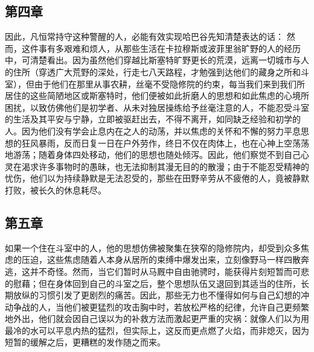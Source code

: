 
\subsection{第四章}

\par

因此，凡恒常持守这种警醒的人，必能有效实现哈巴谷先知清楚表达的话： 然而，这件事有多艰难和烦人，从那些生活在卡拉穆斯或波菲里翁旷野的人的经历中，可清楚看出。因为虽然他们穿越比斯塞特旷野更长的荒漠，远离一切城市与人的住所（穿透广大荒野的深处，行走七八天路程，才勉强到达他们的藏身之所和斗室），但由于他们在那里从事农耕，丝毫不受隐修院的约束，每当我们来到我们所居住的这些简陋地区或斯塞特时，他们便被如此折磨人的思想和如此焦虑的心境所困扰，以致仿佛他们是初学者、从未对独居操练给予丝毫注意的人，不能忍受斗室的生活及其平安与宁静，立即被驱赶出去，不得不离开，如同缺乏经验和初学的人。因为他们没有学会止息内在之人的动荡，并以焦虑的关怀和不懈的努力平息思想的狂风暴雨，反而日复一日在户外劳作，终日不仅在肉体上，也在心神上空荡荡地游荡；随着身体四处移动，他们的思想也随处倾泻。因此，他们察觉不到自己心灵在渴求许多事物时的愚昧，也无法抑制其漫无目的的散漫；由于不能忍受精神的忧伤，他们以为持续静默是无法忍受的，那些在田野辛劳从不疲倦的人，竟被静默打败，被长久的休息耗尽。\par


\subsection{第五章}

\par

如果一个住在斗室中的人，他的思想仿佛被聚集在狭窄的隐修院内，却受到众多焦虑的压迫，这些焦虑随着人本身从居所的束缚中爆发出来，立刻像野马一样四散奔逃，这并不奇怪。然而，当它们暂时从马厩中自由驰骋时，能获得片刻短暂而可悲的慰藉；但在身体回到自己的斗室之后，整个思想队伍又退回到其适当的住所，长期放纵的习惯引发了更剧烈的痛苦。因此，那些无力也不懂得如何与自己幻想的冲动争战的人，当他们被更猛烈的攻击胸中时，若放松严格的纪律，允许自己更频繁地外出，他们就会因自己误以为的补救方法而激起更严重的灾祸：就像人们以为用最冷的水可以平息内热的猛烈，但实际上，这反而更点燃了火焰，而非熄灭，因为短暂的缓解之后，更糟糕的发作随之而来。\par

